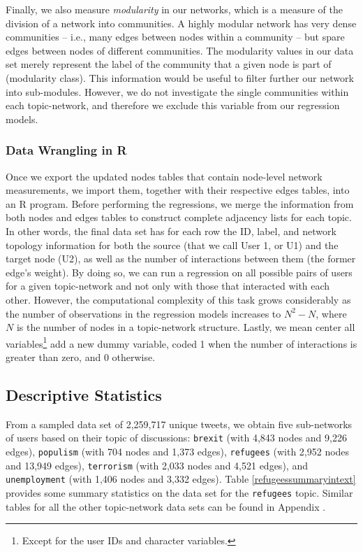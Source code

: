 Finally, we also measure \textit{modularity} in our networks, which is a measure of the division of a network into communities. A highly modular network has very dense communities – i.e., many edges between nodes within a community – but spare edges between nodes of different communities.  The modularity values in our data set merely represent the label of the community that a given node is part of (modularity class). This information would be useful to filter further our network into sub-modules. However, we do not investigate the single communities within each topic-network, and therefore we exclude this variable from our regression models.

\subsubsection{Data Wrangling in R}\label{wrangling-r}
Once we export the updated nodes tables that contain node-level network measurements, we import them, together with their respective edges tables, into an R program. Before performing the regressions, we merge the information from both nodes and edges tables to construct complete adjacency lists for each topic. In other words, the final data set has for each row the ID, label, and network topology information for both the source (that we call User 1, or U1) and the target node (U2), as well as the number of interactions between them (the former edge's weight). By doing so, we can run a regression on all possible pairs of users for a given topic-network and not only with those that interacted with each other. However, the computational complexity of this task grows considerably as the number of observations in the regression models increases to $N^{2} - N$, where $N$ is the number of nodes in a topic-network structure. Lastly, we mean center all variables\footnote{Except for the user IDs and character variables.} add a new dummy variable, coded 1 when the number of interactions is greater than zero, and 0 otherwise.

\subsection{Descriptive Statistics}
From a sampled data set of 2,259,717 unique tweets, we obtain five sub-networks of users based on their topic of discussions: \texttt{brexit} (with 4,843 nodes and 9,226 edges), \texttt{populism} (with 704 nodes and 1,373 edges), \texttt{refugees} (with 2,952 nodes and 13,949 edges), \texttt{terrorism} (with 2,033 nodes and 4,521 edges), and \texttt{unemployment} (with 1,406 nodes and 3,332 edges).
Table \vref{refugeessummaryintext} provides some summary statistics on the data set for the \texttt{refugees} topic. Similar tables for all the other topic-network data sets can be found in Appendix .

